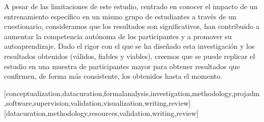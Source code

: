 \documentclass[spanish]{textolivre}
\begin{document}
A pesar de las limitaciones de este estudio, centrado en conocer el impacto de un entrenamiento específico en un mismo grupo de estudiantes a través de un cuestionario, consideramos que los resultados son significativos, han contribuido a aumentar la competencia autónoma de los participantes y a promover su autoaprendizaje. Dado el rigor con el que se ha diseñado esta investigación y los resultados obtenidos (válidos, fiables y viables), creemos que se puede replicar el estudio en una muestra de participantes mayor para obtener resultados que confirmen, de forma más consistente, los obtenidos hasta el momento.



\printbibliography\label{sec-bib}
\begin{contributors}
[conceptualization,datacuration,formalanalysis,investigation,methodology,projadm,software,supervision,validation,visualization,writing,review]
[datacuration,methodology,resources,validation,writing,review]
\end{contributors}
\end{document}
